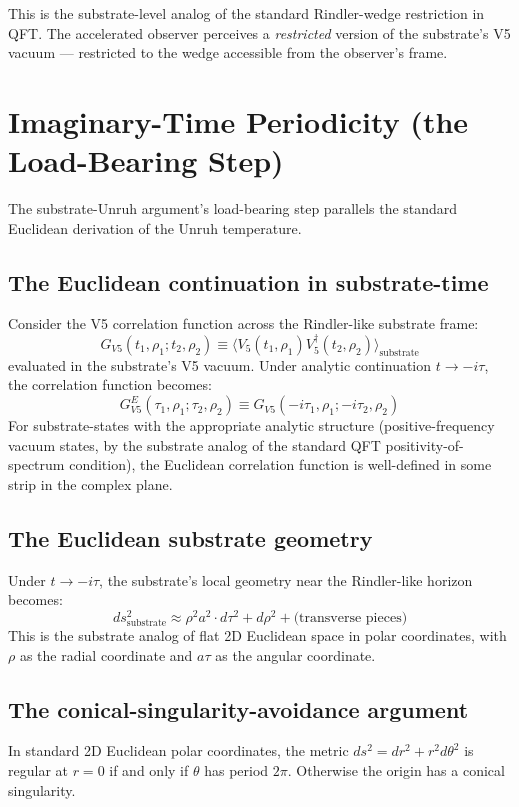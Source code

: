 \documentclass[11pt,a4paper]{article}
\begin{document}
This is the substrate-level analog of the standard Rindler-wedge restriction in QFT. The accelerated observer perceives a \emph{restricted} version of the substrate's V5 vacuum --- restricted to the wedge accessible from the observer's frame.

\section{Imaginary-Time Periodicity (the Load-Bearing Step)}

The substrate-Unruh argument's load-bearing step parallels the standard Euclidean derivation of the Unruh temperature.

\subsection{The Euclidean continuation in substrate-time}

Consider the V5 correlation function across the Rindler-like substrate frame:
\[
G_{V5}(t_1, \rho_1; t_2, \rho_2) \equiv \langle V_5(t_1, \rho_1) V_5^\dagger(t_2, \rho_2)\rangle_{\mathrm{substrate}}
\]
evaluated in the substrate's V5 vacuum. Under analytic continuation $t \to -i\tau$, the correlation function becomes:
\[
G_{V5}^E(\tau_1, \rho_1; \tau_2, \rho_2) \equiv G_{V5}(-i\tau_1, \rho_1; -i\tau_2, \rho_2)
\]
For substrate-states with the appropriate analytic structure (positive-frequency vacuum states, by the substrate analog of the standard QFT positivity-of-spectrum condition), the Euclidean correlation function is well-defined in some strip in the complex plane.

\subsection{The Euclidean substrate geometry}

Under $t \to -i\tau$, the substrate's local geometry near the Rindler-like horizon becomes:
\[
ds^{2}_{\mathrm{substrate}} \approx \rho^{2} a^{2} \cdot d\tau^{2} + d\rho^{2} + \text{(transverse pieces)}
\]
This is the substrate analog of flat 2D Euclidean space in polar coordinates, with $\rho$ as the radial coordinate and $a\tau$ as the angular coordinate.

\subsection{The conical-singularity-avoidance argument}

In standard 2D Euclidean polar coordinates, the metric $ds^{2} = dr^{2} + r^{2} d\theta^{2}$ is regular at $r = 0$ if and only if $\theta$ has period $2\pi$. Otherwise the origin has a conical singularity.
\end{document}
